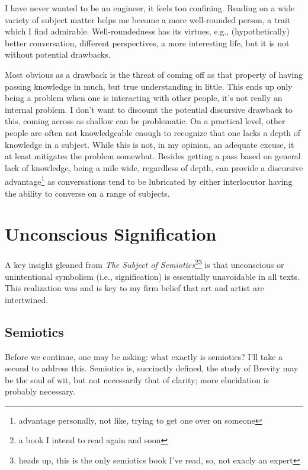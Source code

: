 \documentclass[../butidigress.tex]{subfiles}
\begin{document}
I have never wanted to be  an engineer, it feels too confining.
Reading on a wide variety of subject matter helps me become a more well-rounded person, a trait which I find admirable.
Well-roundedness has its virtues, e.g., (hypothetically) better conversation, different perspectives, a more interesting life, but it is not without potential drawbacks.

Most obvious as a drawback is the threat of coming off as  that property of having passing knowledge in much, but true understanding in little.
This ends up only being a problem when one is interacting with other people, it's not really an internal problem.
I don't want to discount the potential discursive drawback to this, coming across as shallow can be problematic.
On a practical level, other people are often not knowledgeable enough to recognize that one lacks a depth of knowledge in a subject.
While this is not, in my opinion, an adequate excuse, it at least mitigates the problem somewhat.
Besides getting a pass based on general lack of knowledge, being a mile wide, regardless of depth, can provide a discursive advantage\footnote{advantage personally, not like, trying to get one over on someone} as conversations tend to be lubricated by either interlocutor having the ability to converse on a range of subjects.

\section{Unconscious Signification}
A key insight gleaned from \textit{The Subject of Semiotics}\footnote{a book I intend to read again and soon}\footnote{heads up, this is the only semiotics book I've read, so, not exacly an expert} is that unconscious or unintentional symbolism (i.e., signification) is essentially unavoidable in all texts.
This realization was and is key to my firm belief that art and artist are intertwined.

\subsection{Semiotics}
Before we continue, one may be asking: what exactly is semiotics? I'll take a second to address this.
Semiotics is, succinctly defined, the study of 
Brevity may be the soul of wit, but not necessarily that of clarity; more elucidation is probably necessary.
\end{document}
